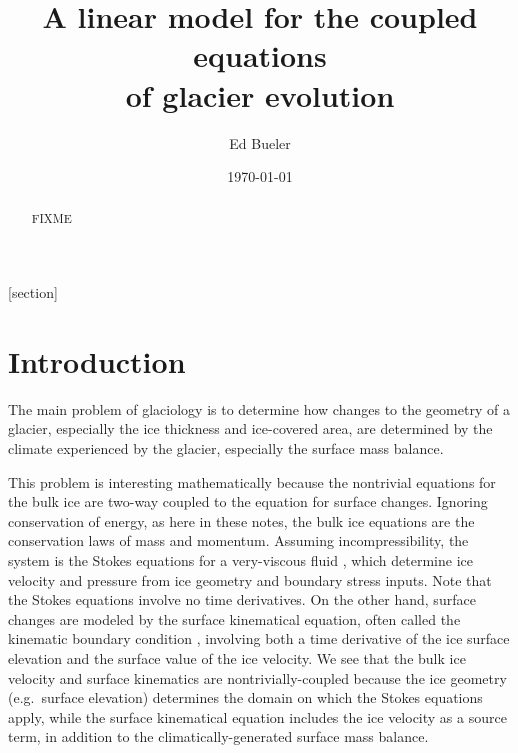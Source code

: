 \documentclass[letterpaper,final,12pt,reqno]{amsart}
\theoremstyle{cstyle}
\theoremstyle{cstyle*}
\theoremstyle{dstyle}
\numberwithin{equation}{section}
\begin{document}
\title[A linear model for the coupled equations of glacier evolution]{A linear model for the coupled equations \\ of glacier evolution}

\author{Ed Bueler}

\date{\today}

\begin{abstract} FIXME
\end{abstract}

\maketitle


\thispagestyle{empty}

[section]


\section{Introduction} \label{sec:intro}

The main problem of glaciology is to determine how changes to the geometry of a glacier, especially the ice thickness and ice-covered area, are determined by the climate experienced by the glacier, especially the surface mass balance.

This problem is interesting mathematically because the nontrivial equations for the bulk ice are two-way coupled to the equation for surface changes.  Ignoring conservation of energy, as here in these notes, the bulk ice equations are the conservation laws of mass and momentum.  Assuming incompressibility, the system is the Stokes equations for a very-viscous fluid \cite{Elmanetal2014,GreveBlatter2009}, which determine ice velocity and pressure from ice geometry and boundary stress inputs.  Note that the Stokes equations involve no time derivatives.  On the other hand, surface changes are modeled by the surface kinematical equation, often called the kinematic boundary condition \cite{GreveBlatter2009}, involving both a time derivative of the ice surface elevation and the surface value of the ice velocity.  We see that the bulk ice velocity and surface kinematics are nontrivially-coupled because the ice geometry (e.g.~surface elevation) determines the domain on which the Stokes equations apply, while the surface kinematical equation includes the ice velocity as a source term, in addition to the climatically-generated surface mass balance.
\end{document}
